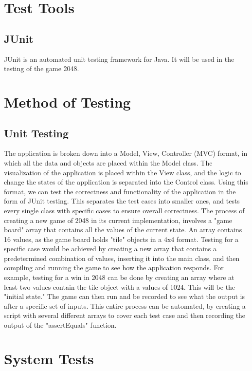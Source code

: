\documentclass[12pt]{article}
\begin{document}
\section{Test Tools}

\subsection{JUnit}
JUnit is an automated unit testing framework for Java. It will be used in the 
testing of the game 2048.
\section{Method of Testing}
\subsection{Unit Testing}
The application is broken down into a Model, View, Controller (MVC) format, in which all the data and objects are placed within the Model class. The visualization of the application is placed within the View class, and the logic to change the states of the application is separated into the Control class. Using this format, we can test the correctness and functionality of the application in the form of JUnit testing. This separates the test cases into smaller ones, and tests every single class with specific cases to ensure overall correctness. The process of creating a new game of 2048 in its current implementation, involves a "game board" array that contains all the values of the current state. An array contains 16 values, as the game board holds "tile" objects in a 4x4 format. Testing for a specific case would be achieved by creating a new array that contains a predetermined combination of values, inserting it into the main class, and then compiling and running the game to see how the application responds. For example, testing for a win in 2048 can be done by creating an array where at least two values contain the tile object with a values of 1024. This will be the "initial state." The game can then run and be recorded to see what the output is after a specific set of inputs. This entire process can be automated, by creating a script with several different arrays to cover each test case and then recording the output of the "assertEquals" function. \\

\section{System Tests}
\end{document}
